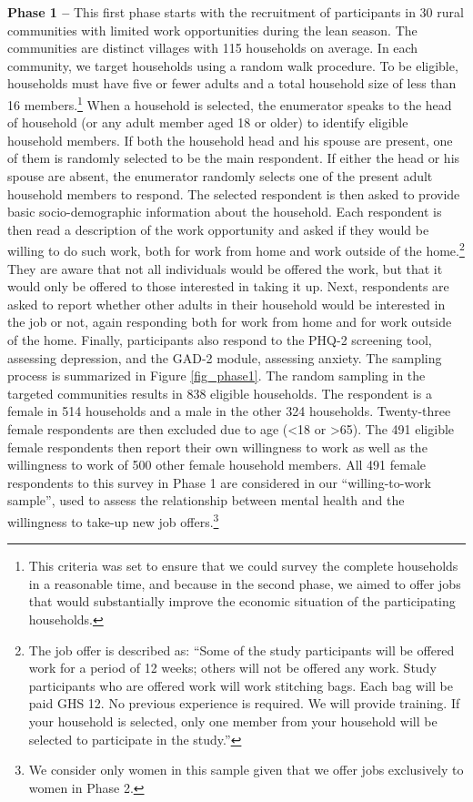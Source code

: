 \documentclass[12pt, a4paper, american]{article}
\begin{document}
\textbf{Phase 1 --} This first phase starts with the recruitment of participants in 30 rural communities with limited work opportunities during the lean season. The communities are distinct villages with 115 households on average. In each community, we target households using a random walk procedure. To be eligible, households must have five or fewer adults and a total household size of less than 16 members.\footnote{This criteria was set to ensure that we could survey the complete households in a reasonable time, and because in the second phase, we aimed to offer jobs that would substantially improve the economic situation of the participating households.} When a household is selected, the enumerator speaks to the head of household (or any adult member aged 18 or older) to identify eligible household members. If both the household head and his spouse are present, one of them is randomly selected to be the main respondent. If either the head or his spouse are absent, the enumerator randomly selects one of the present adult household members to respond. The selected respondent is then asked to provide basic socio-demographic information about the household. Each respondent is then read a description of the work opportunity and asked if they would be willing to do such work, both for work from home and work outside of the home.\footnote{The job offer is described as: ``Some of the study participants will be offered work for a period of 12 weeks; others will not be offered any work. Study participants who are offered work will work stitching bags. Each bag will be paid GHS 12. No previous experience is required. We will provide training. If your household is selected, only one member from your household will be selected to participate in the study.''} They are aware that not all individuals would be offered the work, but that it would only be offered to those interested in taking it up. Next, respondents are asked to report whether other adults in their household would be interested in the job or not, again responding both for work from home and for work outside of the home. Finally, participants also respond to the PHQ-2 screening tool, assessing depression, and the GAD-2 module, assessing anxiety. 
The sampling  process is summarized in Figure \ref{fig_phase1}. The random sampling in the targeted communities results in 838 eligible households. The respondent is a female in 514 households and a male in the other 324 households. Twenty-three female respondents are then excluded due to age (<18 or >65). The 491 eligible female respondents then report their own willingness to work as well as the willingness to work of 500 other female household members. All 491 female respondents to this survey in Phase 1 are considered in our ``willing-to-work sample'', used to assess the relationship between mental health and the willingness to take-up new job offers.\footnote{We consider only women in this sample given that we offer jobs exclusively to women in Phase 2.} 
\end{document}
